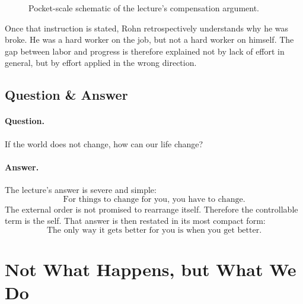 \begin{figure}[t]
\centering
{}
\caption{Pocket-scale schematic of the lecture's compensation argument.}
\end{figure}

Once that instruction is stated, Rohn retrospectively understands why he was broke. He was a hard worker on the job, but not a hard worker on himself. The gap between labor and progress is therefore explained not by lack of effort in general, but by effort applied in the wrong direction.

\subsection{Question \& Answer}

\paragraph{Question.} If the world does not change, how can our life change?

\paragraph{Answer.} The lecture's answer is severe and simple:
\begin{equation}
\text{For things to change for you, you have to change.}
\end{equation}
The external order is not promised to rearrange itself. Therefore the controllable term is the self. That answer is then restated in its most compact form:
\begin{equation}
\text{The only way it gets better for you is when you get better.}
\end{equation}

\section{Not What Happens, but What We Do}

